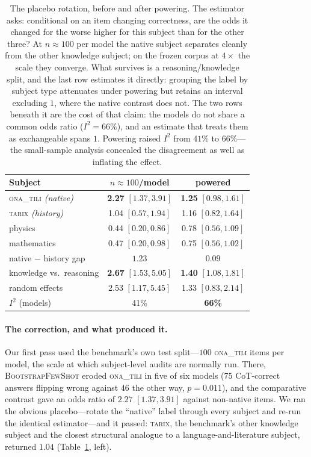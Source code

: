 \documentclass[11pt]{article}
\newcommand{\ona}{\textsc{ona\_tili}}
\newcommand{\tarix}{\textsc{tarix}}
\newcommand{\bsfs}{\textsc{BootstrapFewShot}}
\begin{document}
\begin{table}[t]\centering\small
\caption{The placebo rotation, before and after powering. The estimator asks: conditional
on an item changing correctness, are the odds it changed for the worse higher for this
subject than for the other three? At $n{\approx}100$ per model the native subject
separates cleanly from the other knowledge subject; on the frozen corpus at $4\times$
the scale they converge. What survives is a reasoning/knowledge split, and the last row
estimates it directly: grouping the label by subject type attenuates under powering but
retains an interval excluding $1$, where the native contrast does not. The two rows
beneath it are the cost of that claim: the models do not share a common odds ratio
($I^2{=}66\%$), and an estimate that treats them as exchangeable spans $1$. Powering
raised $I^2$ from $41\%$ to $66\%$---the small-sample analysis concealed the
disagreement as well as inflating the effect.}
\label{tab:placebo}
\setlength{\tabcolsep}{1.5pt}
\begin{tabular}{lcc}
\toprule
Subject & $n{\approx}100$/model & powered \\
\midrule
\ona{} \emph{(native)} & \textbf{2.27} $[1.37, 3.91]$ & \textbf{1.25} $[0.98, 1.61]$ \\
\tarix{} \emph{(history)} & 1.04 $[0.57, 1.94]$ & 1.16 $[0.82, 1.64]$ \\
physics & 0.44 $[0.20, 0.86]$ & 0.78 $[0.56, 1.09]$ \\
mathematics & 0.47 $[0.20, 0.98]$ & 0.75 $[0.56, 1.02]$ \\
\midrule
native $-$ history gap & $1.23$ & $0.09$ \\
\midrule
knowledge vs.\ reasoning & \textbf{2.67} $[1.53, 5.05]$ & \textbf{1.40} $[1.08, 1.81]$ \\
\quad random effects & 2.53 $[1.17, 5.45]$ & 1.33 $[0.83, 2.14]$ \\
\quad $I^2$ (models) & 41\% & \textbf{66\%} \\
\bottomrule
\end{tabular}
\end{table}

\paragraph{The correction, and what produced it.} Our first pass used the benchmark's
own test split---$100$ \ona{} items per model, the scale at which subject-level audits
are normally run. There, \bsfs{} eroded \ona{} in five of six models ($75$ CoT-correct
answers flipping wrong against $46$ the other way, $p{=}0.011$), and the comparative
contrast gave an odds ratio of $2.27$ $[1.37, 3.91]$ against non-native items. We ran
the obvious placebo---rotate the ``native'' label through every subject and re-run the
identical estimator---and it passed: \tarix{}, the benchmark's other knowledge subject
and the closest structural analogue to a language-and-literature subject, returned
$1.04$ (Table~\ref{tab:placebo}, left).
\end{document}
